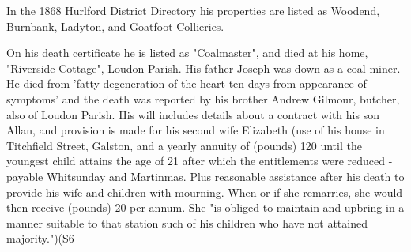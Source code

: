 In the 1868 Hurlford District Directory his properties are listed as Woodend, Burnbank, Ladyton, and Goatfoot Collieries.

On his death certificate he is listed as "Coalmaster", and died at his home, "Riverside Cottage", Loudon Parish. His father Joseph was down as a coal miner. He died from 'fatty degeneration of the heart ten days from appearance of symptoms' and the death was reported by his brother Andrew Gilmour, butcher, also of Loudon Parish. His will includes details about a contract with his son Allan, and provision is made for his second wife Elizabeth (use of his house in Titchfield Street, Galston, and a yearly annuity of (pounds) 120 until the youngest child attains the age of 21 after which the entitlements were reduced - payable Whitsunday and Martinmas. Plus reasonable assistance after his death to provide his wife and children with mourning. When or if she remarries, she would then receive (pounds) 20 per annum. She "is obliged to maintain and upbring in a manner suitable to that station such of his children who have not attained majority.")(S6 